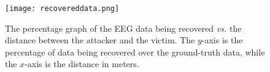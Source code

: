 \begin{figure}[!htb]
        \centering
        \texttt{[image: recovereddata.png]}
        \caption{The percentage graph of the EEG data being recovered \emph{vs.} the distance between the attacker and the victim. The $y$-axis is the percentage of data being recovered over the ground-truth data, while the $x$-axis is the distance in meters. %
        }
        \label{fig:recovereddata}
\end{figure}

